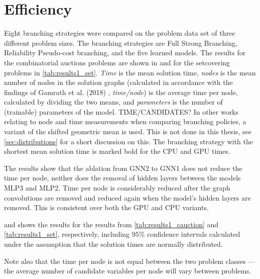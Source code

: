 


\section{Efficiency}\label{sec:res_efficiency}

Eight branching strategies were compared on the problem data set of three different problem sizes. The branching strategies are Full Strong Branching, Reliability Pseudo-cost branching, and the five learned models. The results for the combinatorial auctions problems are shown in  and for the setcovering problems in \cref{tab:results1_set}. \textit{Time} is the mean solution time, \textit{nodes} is the mean number of nodes in the solution graphs (calculated in accordance with the findings of Gamrath et al. (2018) \cite{gamrath2018measuring}, \textit{time/node}) is the average time per node, calculated by dividing the two means, and \textit{parameters} is the number of (trainable) parameters of the model. TIME/CANDIDATES? In other works relating to node and time measurements when comparing branching policies, a variant of the shifted geometric mean is used. This is not done in this thesis, see \cref{sec:distributions} for a short discussion on this. 
The branching strategy with the shortest mean solution time is marked bold for the \gls{CPU} and \gls{GPU} times. 

The results show that the ablation from GNN2 to GNN1 does not reduce the time per node, neither does the removal of hidden layers between the models MLP3 and MLP2. Time per node is considerably reduced after the graph convolutions are removed and reduced again when the model's hidden layers are removed. This is consistent over both the \gls{GPU} and \gls{CPU} variants.  



 and  shows the results for the results from \cref{tab:results1_cauction} and \cref{tab:results1_set}, respectively, including $95 \%$ confidence intervals calculated under the assumption that the solution times are normally distributed.

Note also that the time per node is not equal between the two problem classes --- the average number of candidate variables per node will vary between problems.  
 
